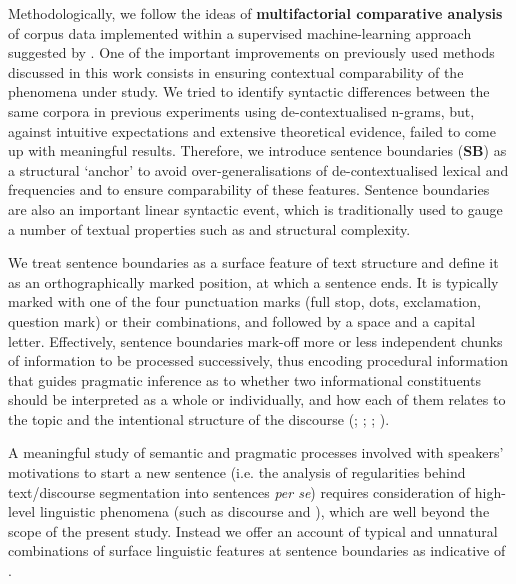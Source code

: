 \documentclass[output=paper]{langsci/langscibook.cls}
\begin{document}
Methodologically, we follow the ideas of \textbf{multifactorial comparative analysis} of corpus data implemented within a supervised machine-learning approach suggested by \citet{Gries:2014}. One of the important improvements on previously used methods discussed in this work consists in ensuring contextual comparability of the phenomena under study. We tried to identify syntactic differences between the same corpora in previous experiments \citep{Kunilovskaya:2015} using de-contextualised  n-grams, but, against intuitive expectations and extensive theoretical evidence, failed to come up with meaningful results. Therefore, we introduce sentence boundaries (\textbf{SB}) as a structural `anchor' to avoid over-generalisations of de-contextualised lexical and  frequencies and to ensure comparability of these features. Sentence boundaries are also an important linear syntactic event, which is traditionally used to gauge a number of textual properties such as  and structural complexity. 

We treat sentence boundaries as a surface feature of text structure and define it as an orthographically marked position, at which a sentence ends. It is typically marked with one of the four punctuation marks (full stop, dots, exclamation, question mark) or their combinations, and followed by a space and a capital letter. Effectively, sentence boundaries mark-off more or less independent chunks of information to be processed successively, thus encoding procedural information that guides pragmatic inference as to whether two informational constituents should be interpreted as a whole or individually, and how each of them relates to the topic and the intentional structure of the discourse (\citealt{guzman2000maintaining}; \citealt{van1976philosophy};   \citealt{carston2007making}; \citealt{unger2011exploring}). 

A meaningful study of semantic and pragmatic processes involved with speakers’ motivations to start a new sentence (i.e. the analysis of regularities behind text/discourse segmentation into sentences \textit{per se}) requires consideration of high-level linguistic phenomena (such as discourse and ), which are well beyond the scope of the present study. Instead we offer an account of typical and unnatural combinations of surface linguistic features at sentence boundaries as indicative of . 
\end{document}
